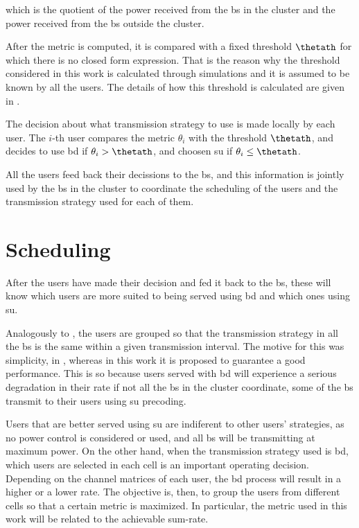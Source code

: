 \noindent
which is the quotient of the power received from the \gls{bs} in the cluster and
the power received from the \gls{bs} outside the cluster.

After the metric is computed, it is compared with a fixed threshold
$\thetath$ for which there is no closed form expression. That is the
reason why the threshold considered in this work is calculated through
simulations and it is assumed to be known by all the users. The details of how
this threshold is calculated are given in .

The decision about what transmission strategy to use is made locally by each
user. The $i$-th user compares the metric $\theta_i$ with the threshold
$\thetath$, and decides to use \gls{bd} if $\theta_i >
\thetath$, and choosen \gls{su} if $\theta_i \leq \thetath$.

All the users feed back their decissions to the \gls{bs}, and this information
is jointly used by the \gls{bs} in the cluster to coordinate the scheduling of
the users and the transmission strategy used for each of them.

\section{Scheduling}\label{sec:sched_scheduling}

After the users have made their decision and fed it back to the \gls{bs}, these
will know which users are more suited to being served using \gls{bd} and which
ones using \gls{su}.

Analogously to \cite{moon13}, the users are grouped so that the transmission
strategy in all the \gls{bs} is the same within a given transmission interval.
The motive for this was simplicity, in \cite{moon13}, whereas in this work it is
proposed to guarantee a good performance. This is so because users served with
\gls{bd} will experience a serious degradation in their rate if not all the
\gls{bs} in the cluster coordinate, \ie some of the \gls{bs} transmit to their
users using \gls{su} precoding.

Users that are better served using \gls{su} are indiferent to other users'
strategies, as no power control is considered or used, and all \gls{bs} will be
transmitting at maximum power. On the other hand, when the transmission strategy
used is \gls{bd}, which users are selected in each cell is an important
operating decision. Depending on the channel matrices of each user, the \gls{bd}
process will result in a higher or a lower rate. The objective is, then, to
group the users from different cells so that a certain metric is maximized. In
particular, the metric used in this work will be related to the achievable
sum-rate.


